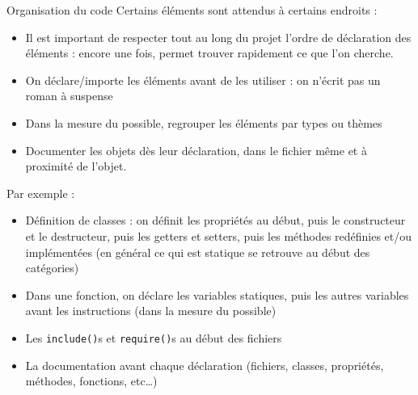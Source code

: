 \begin{frame}{Organisation du code}
	Certains éléments sont attendus à certains endroits :
	\begin{itemize}
		\item Il est important de respecter tout au long du projet l’ordre de déclaration des éléments : encore une fois, permet trouver rapidement ce que l’on cherche.
		\item On déclare/importe les éléments avant de les utiliser : on n’écrit pas un roman à suspense
		\item Dans la mesure du possible, regrouper les éléments par types ou thèmes
		\item Documenter les objets dès leur déclaration, dans le fichier même et à proximité de l’objet.
	\end{itemize}
	Par exemple :
	\begin{itemize}
		\item Définition de classes : on définit les propriétés au début, puis le constructeur et le destructeur, puis les getters et setters, puis les méthodes redéfinies et/ou implémentées (en général ce qui est statique se retrouve au début des catégories)
		\item Dans une fonction, on déclare les variables statiques, puis les autres variables avant les instructions (dans la mesure du possible)
		\item Les \texttt{include()}s et \texttt{require()}s au début des fichiers
		\item La documentation avant chaque déclaration (fichiers, classes, propriétés, méthodes, fonctions, etc\ldots)
	\end{itemize}
\end{frame}

